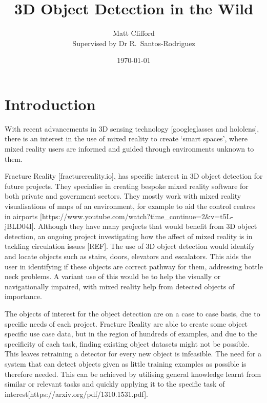 \documentclass[11pt]{article}
\title{3D Object Detection in the Wild}
\author{Matt Clifford \\ Supervised by Dr R.\ Santos-Rodriguez}
\date{\today}
\begin{document}
\maketitle

\section{Introduction}
With recent advancements in 3D sensing technology [googleglasses and hololens], there is an interest in the use of mixed reality to create `smart spaces', where mixed reality users are informed and guided through environments unknown to them.

Fracture Reality [fracturereality.io], has specific interest in 3D object detection for future projects. They specialise in creating bespoke mixed reality software for both private and government sectors. They mostly work with mixed reality visualisations of maps of an environment, for example to aid the control centres in airports [https://www.youtube.com/watch?time_continue=2&v=t5L-jBLD04I]. Although they have many projects that would benefit from 3D object detection, an ongoing project investigating how the affect of mixed reality is in tackling circulation issues [REF]. The use of 3D object detection would identify and locate objects such as stairs, doors, elevators and escalators. This aids the user in identifying if these objects are correct pathway for them, addressing bottle neck problems. A variant use of this would be to help the visually or navigationally impaired, with mixed reality help from detected objects of importance.

The objects of interest for the object detection are on a case to case basis, due to specific needs of each project. Fracture Reality are able to create some object specific use case data, but in the region of hundreds of examples, and due to the specificity of each task, finding existing object datasets might not be possible. This leaves retraining a detector for every new object is infeasible. The need for a system that can detect objects given as little training examples as possible is therefore needed. This can be achieved by utilising general knowledge learnt from similar or relevant tasks and quickly applying it to the specific task of interest[https://arxiv.org/pdf/1310.1531.pdf].
\end{document}
